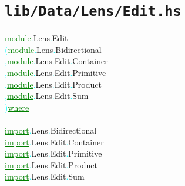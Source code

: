 \section{\texttt{lib/Data/Lens/Edit.hs}}
\label{mod:Data.Lens.Edit}
\textcolor{green}{\underline{module}}\textcolor{cyan}{.}{\rm{}Lens}\textcolor{cyan}{.}{\rm{}Edit}\\\hstab \textcolor{cyan}{(}\hsspace \textcolor{green}{\underline{module}}\textcolor{cyan}{.}{\rm{}Lens}\textcolor{cyan}{.}{\rm{}Bidirectional}\\\hstab \textcolor{cyan}{,}\hsspace \textcolor{green}{\underline{module}}\textcolor{cyan}{.}{\rm{}Lens}\textcolor{cyan}{.}{\rm{}Edit}\textcolor{cyan}{.}{\rm{}Container}\\\hstab \textcolor{cyan}{,}\hsspace \textcolor{green}{\underline{module}}\textcolor{cyan}{.}{\rm{}Lens}\textcolor{cyan}{.}{\rm{}Edit}\textcolor{cyan}{.}{\rm{}Primitive}\\\hstab \textcolor{cyan}{,}\hsspace \textcolor{green}{\underline{module}}\textcolor{cyan}{.}{\rm{}Lens}\textcolor{cyan}{.}{\rm{}Edit}\textcolor{cyan}{.}{\rm{}Product}\\\hstab \textcolor{cyan}{,}\hsspace \textcolor{green}{\underline{module}}\textcolor{cyan}{.}{\rm{}Lens}\textcolor{cyan}{.}{\rm{}Edit}\textcolor{cyan}{.}{\rm{}Sum}\\\hstab \textcolor{cyan}{)}\hsspace \textcolor{green}{\underline{where}}\\\\\textcolor{green}{\underline{import}}\textcolor{cyan}{.}{\rm{}Lens}\textcolor{cyan}{.}{\rm{}Bidirectional}\\\textcolor{green}{\underline{import}}\textcolor{cyan}{.}{\rm{}Lens}\textcolor{cyan}{.}{\rm{}Edit}\textcolor{cyan}{.}{\rm{}Container}\\\textcolor{green}{\underline{import}}\textcolor{cyan}{.}{\rm{}Lens}\textcolor{cyan}{.}{\rm{}Edit}\textcolor{cyan}{.}{\rm{}Primitive}\\\textcolor{green}{\underline{import}}\textcolor{cyan}{.}{\rm{}Lens}\textcolor{cyan}{.}{\rm{}Edit}\textcolor{cyan}{.}{\rm{}Product}\\\textcolor{green}{\underline{import}}\textcolor{cyan}{.}{\rm{}Lens}\textcolor{cyan}{.}{\rm{}Edit}\textcolor{cyan}{.}{\rm{}Sum}\\
